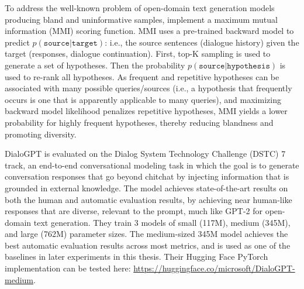To address the well-known problem of open-domain text generation models producing bland and uninformative samples, \cite{zhang2019dialogpt} implement a maximum mutual information (MMI) scoring function. MMI uses a pre-trained backward model to predict $p(\texttt{source} | \texttt{target})$: i.e., the source sentences (dialogue history) given the target (responses, dialogue continuation). First, top-K sampling is used to generate a set of hypotheses. Then the probability $p(\texttt{source} | \texttt{hypothesis})$ is used to re-rank all hypotheses. As frequent and repetitive hypotheses can be associated with many possible queries/sources (i.e., a hypothesis that frequently occurs is one that is apparently applicable to many queries), and maximizing backward model likelihood penalizes repetitive hypotheses, MMI yields a lower probability for highly frequent hypotheses, thereby reducing blandness and promoting diversity. 

DialoGPT is evaluated on the Dialog System Technology Challenge (DSTC) 7 track, an end-to-end conversational modeling task in which the goal is to generate conversation responses that go beyond chitchat by injecting information that is grounded in external knowledge. The model achieves state-of-the-art results on both the human and automatic evaluation results, by achieving near human-like responses that are diverse, relevant to the prompt, much like GPT-2 for open-domain text generation. They train 3 models of small (117M), medium (345M), and large (762M) parameter sizes. The medium-sized 345M model achieves the best automatic evaluation results across most metrics, and is used as one of the baselines in later experiments in this thesis. Their Hugging Face PyTorch implementation can be tested here: \url{https://huggingface.co/microsoft/DialoGPT-medium}.






